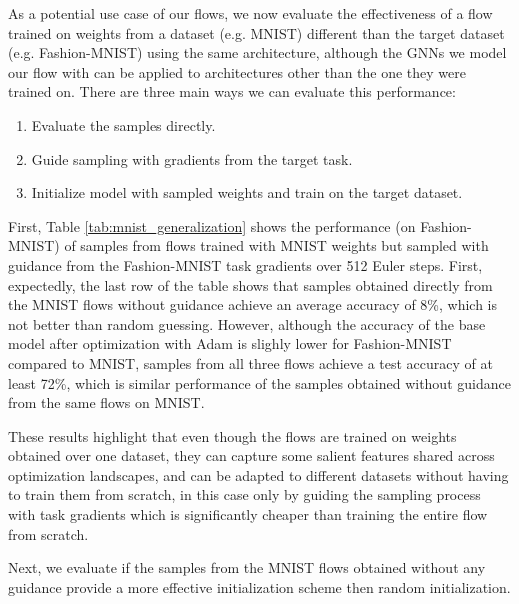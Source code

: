As a potential use case of our flows, we now evaluate the effectiveness of a flow trained on weights from a dataset (e.g. MNIST) different than the target dataset (e.g. Fashion-MNIST) using the same architecture, although the GNNs we model our flow with can be applied to architectures other than the one they were trained on. There are three main ways we can evaluate this performance:
\begin{enumerate}
    \item Evaluate the samples directly.
    \item Guide sampling with gradients from the target task. 
    \item Initialize model with sampled weights and train on the target dataset.
\end{enumerate}

First, Table \ref{tab:mnist_generalization} shows the performance (on Fashion-MNIST) of samples from flows trained with MNIST weights but sampled with guidance from the Fashion-MNIST task gradients over 512 Euler steps. First, expectedly, the last row of the table shows that samples obtained directly from the MNIST flows without guidance achieve an average accuracy of 8\%, which is not better than random guessing. However, although the accuracy of the base model after optimization with Adam is slighly lower for Fashion-MNIST compared to MNIST, samples from all three flows achieve a test accuracy of at least 72\%, which is similar performance of the samples obtained without guidance from the same flows on MNIST. 

These results highlight that even though the flows are trained on weights obtained over one dataset, they can capture some salient features shared across optimization landscapes, and can be adapted to different datasets without having to train them from scratch, in this case only by guiding the sampling process with task gradients which is significantly cheaper than training the entire flow from scratch.  

Next, we evaluate if the samples from the MNIST flows obtained without any guidance provide a more effective initialization scheme then random initialization. 

